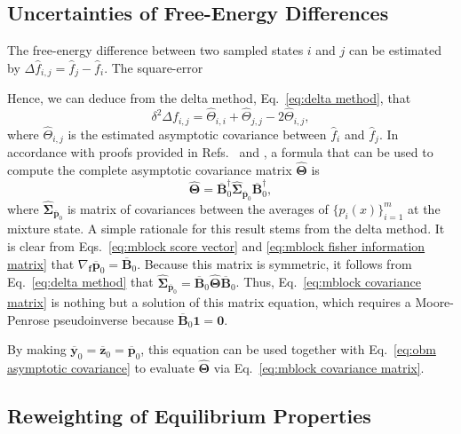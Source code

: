 \documentclass[aip,jcp,reprint,amsmath,amssymb]{revtex4-1}
\newcommand{\mt}[1]{\boldsymbol{\mathbf{#1}}}           %
\newcommand{\vt}[1]{\boldsymbol{\mathbf{#1}}}           %
\begin{document}
\subsection{Uncertainties of Free-Energy Differences}
\label{sec:uncertainties of free-energy differences}

The free-energy difference between two sampled states $i$ and $j$ can be estimated by $\Delta \hat f_{i,j} = \hat f_j - \hat f_i$. The square-error 

Hence, we can deduce from the delta method, Eq.~\eqref{eq:delta method}, that
\begin{equation}
\delta^2 \Delta f_{i,j} = \hat \Theta_{i,i} + \hat \Theta_{j,j} - 2\hat \Theta_{i,j},
\end{equation}
where $\hat \Theta_{i,j}$ is the estimated asymptotic covariance between $\hat f_i$ and $\hat f_j$. In accordance with proofs provided in Refs.~ and , a formula that can be used to compute the complete asymptotic covariance matrix $\hat{\mt \Theta}$ is
\begin{equation}
\label{eq:mblock covariance matrix}
\hat{\mt \Theta} = \overline{\mt B}_0^\dag \hat{\mt \Sigma}_{\overline{\vt p}_0} \overline{\mt B}_0^\dag,
\end{equation}
where $\hat{\mt \Sigma}_{\overline{\vt p}_0}$ is matrix of covariances between the averages of $\{p_i(x)\}_{i=1}^m$ at the mixture state. A simple rationale for this result stems from the delta method. It is clear from Eqs.~\eqref{eq:mblock score vector} and \eqref{eq:mblock fisher information matrix} that $\nabla_{\vt f}\overline{\vt p}_0 = \overline{\mt B}_0$. Because this matrix is symmetric, it follows from Eq.~\eqref{eq:delta method} that $\hat{\mt \Sigma}_{\overline{\vt p}_0} = \overline{\mt B}_0 \hat{\mt \Theta} \overline{\mt B}_0$. Thus, Eq.~\eqref{eq:mblock covariance matrix} is nothing but a solution of this matrix equation, which requires a Moore-Penrose pseudoinverse because $\overline{\mt B}_0 \vt 1 = \vt 0$.

By making $\overline{\vt y}_0 = \overline{\vt z}_0 = \overline{\vt p}_0$, this equation can be used together with Eq.~\eqref{eq:obm asymptotic covariance} to evaluate $\hat{\mt \Theta}$ via Eq.~\eqref{eq:mblock covariance matrix}.

\subsection{Reweighting of Equilibrium Properties}
\end{document}
